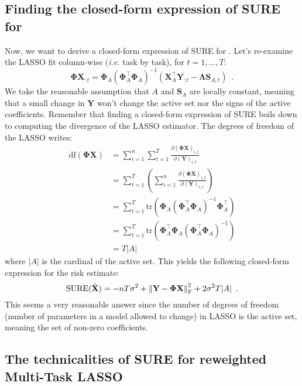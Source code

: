 \documentclass[a4paper,10pt]{article}
\theoremstyle{definition}
\begin{document}
\subsection*{Finding the closed-form expression of SURE for }

Now, we want to derive a closed-form expression of SURE for . Let's re-examine the LASSO fit column-wise (\textit{i.e.} task by task), for $t=1, \dots, T$:
%
\begin{equation*}
    \mathbf{\Phi X}_{:t}
    = \mathbf{\Phi}_A(\mathbf{\Phi}_A^{\top}\mathbf{\Phi}_A)^{-1}(\mathbf{X}^{\top}_A\mathbf{Y}_{:t} - \mathbf{\Lambda}\mathbf{S}_{A, t})
    \enspace .
\end{equation*}
%
We take the reasonable assumption that $A$ and $\mathbf{S}_A$ are locally constant, meaning that a small change in $\mathbf{Y}$ won't change the active set nor the signs of the active
coefficients. Remember that finding a closed-form expression of SURE boils down to computing the divergence of the LASSO estimator.
The degrees of freedom of the LASSO writes:
%
\begin{align*}
    \text{df}(\mathbf{\Phi X})
    &= \sum_{i=1}^n \sum_{t=1}^T \frac{\partial (\mathbf{\Phi X})_{i,t}}{\partial (\mathbf{Y})_{i, t}} \\
    &= \sum_{t=1}^T \left ( \sum_{i=1}^n \frac{\partial (\mathbf{\Phi X})_{i,t}}{\partial (\mathbf{Y})_{i, t}} \right ) \\
    &= \sum_{t=1}^T \text{tr}(\mathbf{\Phi}_A (\mathbf{\Phi}_A^{\top} \mathbf{\Phi}_A)^{-1}\mathbf{\Phi}_A^{\top}) \\
    &= \sum_{t=1}^T \text{tr}(\mathbf{\Phi}_A^{\top}\mathbf{\Phi}_A (\mathbf{\Phi}_A^{\top} \mathbf{\Phi}_A)^{-1}) \\
    &= T \lvert A \rvert
\end{align*}
%
where $\lvert A \rvert$ is the cardinal of the active set. This yields the following closed-form expression for the risk estimate:
%
\begin{equation*}
    \text{SURE}(\hat{\bf{X}}) = - n T \sigma^2 + \left \lVert \mathbf{Y} -  \mathbf{\Phi X} \right \rVert^2_{\text{F}} + 2 \sigma^2 T \lvert A \rvert
    \enspace .
\end{equation*}
%
This seems a very reasonable answer since the number of degrees of freedom (number of parameters in a model allowed to change) in LASSO is the active set, meaning the set of non-zero
coefficients.

\subsection*{The technicalities of SURE for reweighted Multi-Task LASSO}


\newpage


\end{document}
